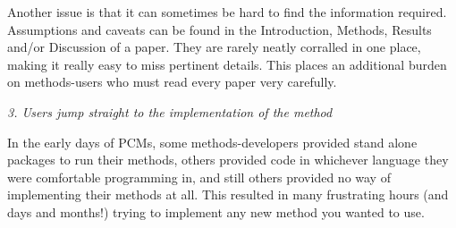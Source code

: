 \documentclass[a4paper,12pt]{article}
\renewcommand{\subsection}[1]{
  \bigskip
  \begin{center}
  \begin{large}
  \normalfont\itshape #1
  \end{large}
  \end{center}
}
\begin{document}
Another issue is that it can sometimes be hard to find the information required. Assumptions and caveats can be found in the Introduction, Methods, Results and/or Discussion of a paper. 
They are rarely neatly corralled in one place, making it really easy to miss pertinent details. 
This places an additional burden on methods-users who must read every paper very carefully.

\subsection{3. Users jump straight to the implementation of the method}
In the early days of PCMs, some methods-developers provided stand alone packages to run their methods, others provided code in whichever language they were comfortable programming in, and still others provided no way of implementing their methods at all. 
This resulted in many frustrating hours (and days and months!) trying to implement any new method you wanted to use.\\
\end{document}
